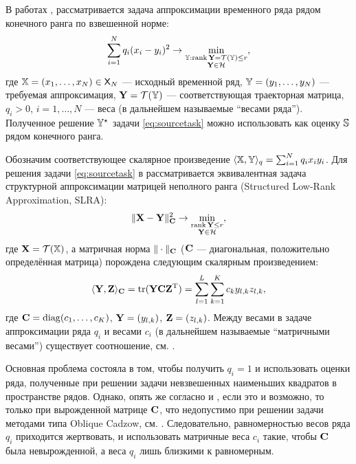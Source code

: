 \documentclass[10pt]{article}
\DeclareMathOperator{\tr}{tr}
\def\rank{\mathop{\mathrm{rank}}}
\begin{document}
В работах \cite{Zvonarev2015}, \cite{Gillard2014} рассматривается задача аппроксимации временного ряда рядом конечного ранга по взвешенной норме:
\begin{equation}\label{eq:sourcetask}
\sum_{i = 1}^N q_i (x_i - y_i)^2 \to \min_{\substack{\tsY: \rank \bfY  = \calT(\tsY) \le r \\ \bfY \in \calH}},
\end{equation}
где $\mathbb{X} = (x_1, \ldots, x_N) \in \mathsf{X}_N$ --- исходный временной ряд, $\mathbb{Y} = (y_1, \ldots, y_N)$ --- требуемая аппроксимация, $\mathbf{Y} = \mathcal{T}(\mathbb{Y})$ --- соответствующая траекторная матрица, $q_i > 0$, $i = 1, \ldots, N$ --- веса (в дальнейшем называемые ``весами ряда''). 
Полученное решение $\mathbb{Y}^\star$ задачи \eqref{eq:sourcetask} можно использовать как оценку $\mathbb{S}$ рядом конечного ранга. 

Обозначим соответствующее скалярное произведение $\langle \mathbb{X}, \mathbb{Y} \rangle_q = \sum_{i=1}^N q_i x_i y_i$.  Для решения задачи \eqref{eq:sourcetask} в \cite{Zvonarev2015} рассматривается эквивалентная задача структурной аппроксимации матрицей неполного ранга (Structured Low-Rank Approximation, SLRA):
\begin{equation*}
	\|\bfX - \bfY\|^2_\bfC \to \min_{\substack{\rank \bfY \le r \\ \bfY \in \calH}},
\end{equation*}
где $\mathbf{X} = \mathcal{T}(\mathbb{X})$, а матричная норма $\|\cdot\|_{\mathbf{C}}$ ($\mathbf{C}$ --- диагональная, положительно определённая матрица) порождена следующим скалярным произведением:
\begin{equation*}
\langle \bfY, \bfZ \rangle_\bfC = \tr(\bfY \bfC \bfZ^\rmT) = \sum_{l=1}^L \sum_{k=1}^K c_k y_{l,k} z_{l, k},
\end{equation*}
где $\mathbf{C} = \mathop{\mathrm{diag}}(c_1, \ldots, c_K)$, $\mathbf{Y} = (y_{l, k})$, $\mathbf{Z} = (z_{l, k})$. Между весами в задаче аппроксимации ряда $q_i$ и весами $c_i$ (в дальнейшем называемые ``матричными весами'') существует соотношение, см. \cite[Proposition 4]{Zvonarev2015}.

Основная проблема состояла в том, чтобы получить $q_i = 1$ и использовать оценки ряда, полученные при решении задачи невзвешенных наименьших квадратов в пространстве рядов. Однако, опять же согласно \cite[Lemma 1]{Zvonarev2015} и \cite{Gillard2014}, если это и возможно, то только при вырожденной матрице $\mathbf{C}$, что недопустимо при решении задачи методами типа Oblique Cadzow, см. \cite[Remark 4]{Zvonarev2015}. Следовательно, равномерностью весов ряда $q_i$ приходится жертвовать, и использовать матричные веса $c_i$ такие, чтобы $\mathbf{C}$ была невырожденной, а веса $q_i$ лишь близкими к равномерным.
\end{document}

